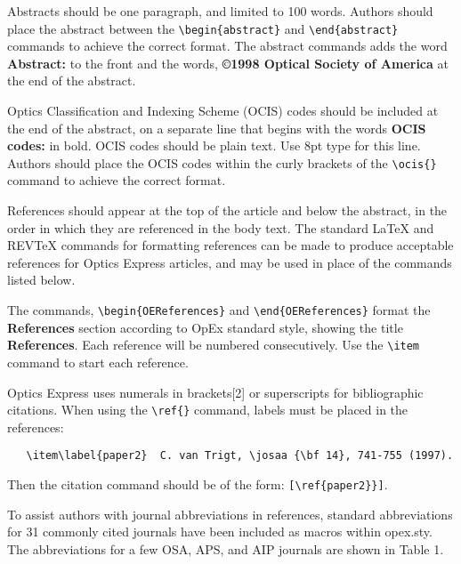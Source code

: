 Abstracts should be one paragraph, and limited to 100 
words. Authors should place the abstract between the 
\verb+\begin{abstract}+ and \verb+\end{abstract}+ 
commands to achieve the correct format.  The abstract 
commands adds the word {\bf Abstract:} to the front and the 
words, {\bf \copyright 1998 Optical Society of America}  
at the end of the abstract.

Optics Classification and Indexing Scheme (OCIS) codes 
should be included at the end of the abstract, on a 
separate line that begins with the words {\bf OCIS codes:} 
in bold. OCIS codes should be plain text.  Use 8pt type 
for this line.  Authors should
place the OCIS codes within the curly brackets of the 
\verb+\ocis{}+ command to achieve the correct 
format.

References should appear at the top of the article and 
below the abstract, in the order in which they are 
referenced in the body text. The standard LaTeX and REVTeX
commands for formatting references can be made to produce 
acceptable references for Optics Express articles, and 
may be used in place of the commands listed below.

The commands, \verb+\begin{OEReferences}+ 
and \verb+\end{OEReferences}+ format the {\bf References} 
section according to OpEx standard style, showing the
title {\bf References}.  Each reference will
be numbered consecutively.  Use the \verb+\item+ command
to start each reference. 

Optics Express uses numerals in brackets[2] or 
superscripts for bibliographic citations.  When using the 
\verb+\ref{}+ command, labels must be placed in the references:
\begin{verbatim}
   \item\label{paper2}  C. van Trigt, \josaa {\bf 14}, 741-755 (1997).
\end{verbatim}
Then the citation command should be of the form: 
\verb+[\ref{paper2}}]+.


To assist authors with journal abbreviations in references, 
standard abbreviations for 31 commonly cited journals 
have been included as macros within opex.sty.  The abbreviations 
for a few OSA, APS, and AIP journals are shown in Table 1.


